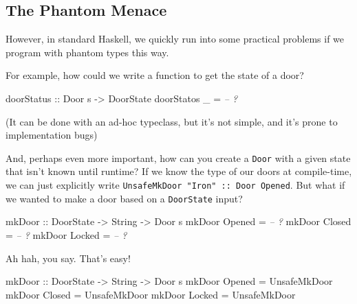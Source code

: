 \documentclass[]{article}
\newenvironment{Shaded}{}{}
\newcommand{\DataTypeTok}[1]{\textcolor[rgb]{0.56,0.13,0.00}{#1}}
\newcommand{\CommentTok}[1]{\textcolor[rgb]{0.38,0.63,0.69}{\textit{#1}}}
\newcommand{\OtherTok}[1]{\textcolor[rgb]{0.00,0.44,0.13}{#1}}
\newcommand{\FunctionTok}[1]{\textcolor[rgb]{0.02,0.16,0.49}{#1}}
\newcommand{\NormalTok}[1]{#1}
\begin{document}
\subsection{The Phantom Menace}\label{the-phantom-menace}

However, in standard Haskell, we quickly run into some practical problems if we
program with phantom types this way.

For example, how could we write a function to get the state of a door?

\begin{Shaded}
\begin{Highlighting}[]
\OtherTok{doorStatus ::} \DataTypeTok{Door}\NormalTok{ s }\OtherTok{->} \DataTypeTok{DoorState}
\NormalTok{doorStatos _ }\FunctionTok{=} \CommentTok{-- ?}
\end{Highlighting}
\end{Shaded}

(It can be done with an ad-hoc typeclass, but it's not simple, and it's prone to
implementation bugs)

And, perhaps even more important, how can you create a \texttt{Door} with a
given state that isn't known until runtime? If we know the type of our doors at
compile-time, we can just explicitly write
\texttt{UnsafeMkDoor\ "Iron"\ ::\ Door\ \textquotesingle{}Opened}. But what if
we wanted to make a door based on a \texttt{DoorState} input?

\begin{Shaded}
\begin{Highlighting}[]
\OtherTok{mkDoor ::} \DataTypeTok{DoorState} \OtherTok{->} \DataTypeTok{String} \OtherTok{->} \DataTypeTok{Door}\NormalTok{ s}
\NormalTok{mkDoor }\DataTypeTok{Opened} \FunctionTok{=} \CommentTok{-- ?}
\NormalTok{mkDoor }\DataTypeTok{Closed} \FunctionTok{=} \CommentTok{-- ?}
\NormalTok{mkDoor }\DataTypeTok{Locked} \FunctionTok{=} \CommentTok{-- ?}
\end{Highlighting}
\end{Shaded}

Ah hah, you say. That's easy!

\begin{Shaded}
\begin{Highlighting}[]
\OtherTok{mkDoor ::} \DataTypeTok{DoorState} \OtherTok{->} \DataTypeTok{String} \OtherTok{->} \DataTypeTok{Door}\NormalTok{ s}
\NormalTok{mkDoor }\DataTypeTok{Opened} \FunctionTok{=} \DataTypeTok{UnsafeMkDoor}
\NormalTok{mkDoor }\DataTypeTok{Closed} \FunctionTok{=} \DataTypeTok{UnsafeMkDoor}
\NormalTok{mkDoor }\DataTypeTok{Locked} \FunctionTok{=} \DataTypeTok{UnsafeMkDoor}
\end{Highlighting}
\end{Shaded}
\end{document}

